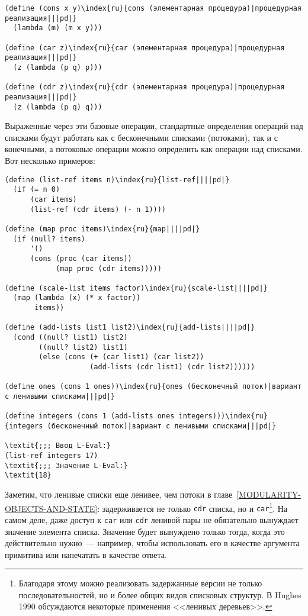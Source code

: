 \begin{Verbatim}[fontsize=\small]
(define (cons x y)\index{ru}{cons (элементарная процедура)|процедурная реализация|||pd|}
  (lambda (m) (m x y)))

(define (car z)\index{ru}{car (элементарная процедура)|процедурная реализация|||pd|}
  (z (lambda (p q) p)))

(define (cdr z)\index{ru}{cdr (элементарная процедура)|процедурная реализация|||pd|}
  (z (lambda (p q) q)))
\end{Verbatim}

Выраженные через эти базовые операции, стандартные
определения операций над списками будут работать как с бесконечными
списками (потоками), так и с конечными, а потоковые операции можно
определить как операции над списками.  Вот несколько примеров:

\begin{Verbatim}[fontsize=\small]
(define (list-ref items n)\index{ru}{list-ref||||pd|}
  (if (= n 0)
      (car items)
      (list-ref (cdr items) (- n 1))))

(define (map proc items)\index{ru}{map||||pd|}
  (if (null? items)
      '()
      (cons (proc (car items))
            (map proc (cdr items)))))

(define (scale-list items factor)\index{ru}{scale-list||||pd|}
  (map (lambda (x) (* x factor))
       items))

(define (add-lists list1 list2)\index{ru}{add-lists||||pd|}
  (cond ((null? list1) list2)
        ((null? list2) list1)
        (else (cons (+ (car list1) (car list2))
                    (add-lists (cdr list1) (cdr list2))))))

(define ones (cons 1 ones))\index{ru}{ones (бесконечный поток)|вариант с ленивыми списками|||pd|}

(define integers (cons 1 (add-lists ones integers)))\index{ru}{integers (бесконечный поток)|вариант с ленивыми списками|||pd|}

\textit{;;; Ввод L-Eval:}
(list-ref integers 17)
\textit{;;; Значение L-Eval:}
\textit{18}
\end{Verbatim}

Заметим, что ленивые списки еще ленивее, чем потоки в 
главе~\ref{MODULARITY-OBJECTS-AND-STATE}: задерживается не
только {\tt cdr} списка, но и {\tt car}\footnote{Благодаря этому можно 
реализовать задержанные версии
не только последовательностей, но и более общих видов списковых структур. В
Hughes 1990 обсуждаются некоторые 
применения 
<<ленивых деревьев>>.}.
На самом деле, даже доступ к {\tt car} или {\tt cdr}
ленивой пары не обязательно вынуждает значение элемента
списка.  Значение будет вынуждено только тогда, когда это
действительно нужно~--- например, чтобы использовать его в качестве
аргумента примитива или напечатать в качестве ответа.


